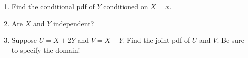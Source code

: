 \documentclass[11pt,letterpaper]{article}
\begin{document}
\begin{enumerate}
\begin{enumerate}
		\item Find the conditional pdf of $Y$ conditioned on $X=x$.
		\vfill

		\item Are $X$ and $Y$ independent?
		\vfill

		\item Suppose $U = X+2Y$ and $V = X-Y$. Find the joint pdf of $U$ and $V$. Be sure to specify the domain!
		\vfill
	\end{enumerate}
\end{enumerate}
\end{document}
